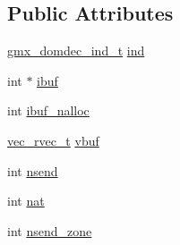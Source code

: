 \subsection*{\-Public \-Attributes}
\begin{DoxyCompactItemize}
\item 
\hyperlink{structgmx__domdec__ind__t}{gmx\-\_\-domdec\-\_\-ind\-\_\-t} \hyperlink{structdd__comm__setup__work__t_a8dc2724145f1d417b82f883b00985c4a}{ind}
\item 
int $\ast$ \hyperlink{structdd__comm__setup__work__t_a66a4b6cf4a7bc82c223ea3a574fc187a}{ibuf}
\item 
int \hyperlink{structdd__comm__setup__work__t_ab9f814741a52fcf27001504572afd722}{ibuf\-\_\-nalloc}
\item 
\hyperlink{structvec__rvec__t}{vec\-\_\-rvec\-\_\-t} \hyperlink{structdd__comm__setup__work__t_aa149d7bcabe602950e0605da6065ead7}{vbuf}
\item 
int \hyperlink{structdd__comm__setup__work__t_a86c7c026e667cb5ff6f019afda54ae5f}{nsend}
\item 
int \hyperlink{structdd__comm__setup__work__t_a46b09c1990cf0f8fda1be1e7e1e6b687}{nat}
\item 
int \hyperlink{structdd__comm__setup__work__t_aed625bfe4677adf11ccb53bbb129d8c3}{nsend\-\_\-zone}
\end{DoxyCompactItemize}


